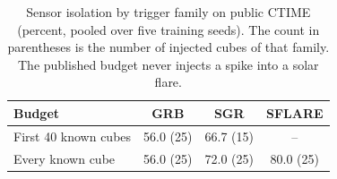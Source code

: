 \begin{table}[t]
\caption{Sensor isolation by trigger family on public CTIME (percent, pooled over five training seeds). The count in parentheses is the number of injected cubes of that family. The published budget never injects a spike into a solar flare.}
\label{tab:family}
\centering
\small
\begin{tabular}{lccc}
\toprule
Budget & GRB & SGR & SFLARE \\
\midrule
First 40 known cubes & 56.0 (25) & 66.7 (15) & -- \\
Every known cube & 56.0 (25) & 72.0 (25) & 80.0 (25) \\
\bottomrule
\end{tabular}
\end{table}
